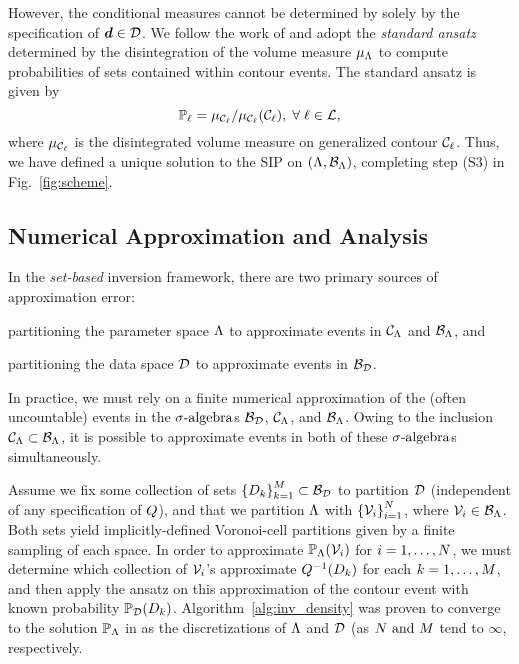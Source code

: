 However, the conditional measures cannot be determined by solely by the specification of $\operatorname*{\boldsymbol{d}}\in\mathcal{D}$. 
We follow the work of \cite{BET+14} and adopt the \emph{standard ansatz} determined by the disintegration of the volume measure $\mu_{{\Lambda}}$ to compute probabilities of sets contained within contour events. 
The standard ansatz is given by 
\begin{equation}\label{eq:standard_ansatz}
\mathbb{P}_\ell = \mu_{\mathcal{C}_\ell} / \mu_{\mathcal{C}_\ell}(\mathcal{C}_\ell), \; \forall \; \ell \in \mathcal{L},
\end{equation}
where $\mu_{\mathcal{C}_\ell}$ is the disintegrated volume measure on generalized contour $\mathcal{C}_\ell$.
Thus, we have defined a unique solution to the SIP on ${({\Lambda}, \mathcal{B}_{{\Lambda}})}$, completing step (S3) in Fig.~\ref{fig:scheme}. 




\subsection{Numerical Approximation and Analysis}\label{sec:set-approx}
In the \emph{set-based} inversion framework, there are two primary sources of approximation error: 
\begin{description}[leftmargin=!, labelwidth=0.7in]
  \item[(1)] partitioning the parameter space ${\Lambda}$ to approximate events in $\mathcal{C}_{{\Lambda}}$ and $\mathcal{B}_{{\Lambda}}$, and
  \item[(2)]  partitioning the data space $\mathcal{D}$ to approximate events in $\mathcal{B}_{\mathcal{D}}$.
\end{description}
In practice, we must rely on a finite numerical approximation of the (often uncountable) events in the $\sigma\text{-algebra}$s $\mathcal{B}_{\mathcal{D}}$, $\mathcal{C}_{{\Lambda}}$, and $\mathcal{B}_{{\Lambda}}$.
Owing to the inclusion $\mathcal{C}_{{\Lambda}} \subset \mathcal{B}_{{\Lambda}}$, it is possible to approximate events in both of these $\sigma\text{-algebra}$s simultaneously. 

Assume we fix some collection of sets $\left\{D_k\right\}_{k=1}^{M} \subset \mathcal{B}_{\mathcal{D}}$ to partition $\mathcal{D}$ (independent of any specification of $Q$), and that we partition ${\Lambda}$ with $\left\{\mathcal{V}_i\right\}_{i=1}^{N}$, where $\mathcal{V}_i \in \mathcal{B}_{{\Lambda}}$. 
Both sets yield implicitly-defined Voronoi-cell partitions given by a finite sampling of each space.
In order to approximate $\operatorname*{\mathbb{P}_{{\Lambda}}}(\mathcal{V}_i)$ for $i=1,\hdots,N$, we must determine which collection of $\mathcal{V}_i$'s approximate $Q^{-1}(D_k)$ for each $k=1,\hdots,M$, and then apply the ansatz on this approximation of the contour event with known probability $\operatorname*{\mathbb{P}_{\mathcal{D}}}(D_k)$.
Algorithm~\ref{alg:inv_density} was proven to converge to the solution $\operatorname*{\mathbb{P}_{{\Lambda}}}$ in \cite{BET+14-arxiv} as the discretizations of ${\Lambda}$ and $\mathcal{D}$ (as ${N \text{ and } M}$ tend to $\infty$, respectively. 


